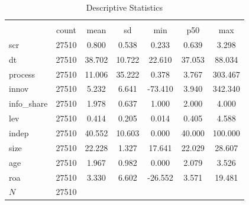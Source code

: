 \begin{table}[htbp]\centering\small
\def\sym#1{\ifmmode^{#1}\else\(^{#1}\)\fi}
\caption{Descriptive Statistics}
\begin{tabular}{l*{1}{cccccc}}
\hline\hline
            &\multicolumn{6}{c}{}                                                         \\
            &       count&        mean&          sd&         min&         p50&         max\\
\hline
scr         &       27510&       0.800&       0.538&       0.233&       0.639&       3.298\\
dt          &       27510&      38.702&      10.722&      22.610&      37.053&      88.034\\
process     &       27510&      11.006&      35.222&       0.378&       3.767&     303.467\\
innov       &       27510&       5.232&       6.641&     -73.410&       3.940&     342.340\\
info\_share  &       27510&       1.978&       0.637&       1.000&       2.000&       4.000\\
lev         &       27510&       0.414&       0.205&       0.014&       0.405&       4.588\\
indep       &       27510&      40.552&      10.603&       0.000&      40.000&     100.000\\
size        &       27510&      22.228&       1.327&      17.641&      22.029&      28.607\\
age         &       27510&       1.967&       0.982&       0.000&       2.079&       3.526\\
roa         &       27510&       3.330&       6.602&     -26.552&       3.571&      19.481\\
\hline
\(N\)       &       27510&            &            &            &            &            \\
\hline\hline
\end{tabular}
\end{table}
